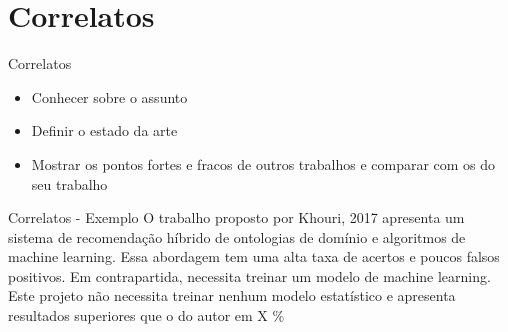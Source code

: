 \section{Correlatos}

\begin{frame}	
	\begin{block}{Correlatos}
		 \begin{itemize}
			  \item Conhecer sobre o assunto			  
			  \item Definir o estado da arte
			  \item Mostrar os pontos fortes e fracos de outros trabalhos e comparar com os do seu trabalho 
		  \end{itemize}
	\end{block}
\end{frame}

\begin{frame}	
	\begin{block}{Correlatos - Exemplo}
		O trabalho proposto por Khouri, 2017 apresenta um sistema de recomendação híbrido de ontologias de domínio e algoritmos de machine learning. Essa abordagem tem uma alta taxa de acertos e poucos falsos positivos. Em contrapartida, necessita treinar um modelo de machine learning. Este projeto não necessita treinar nenhum modelo estatístico e apresenta resultados superiores que o do autor em X $\%$
	\end{block}
\end{frame}
